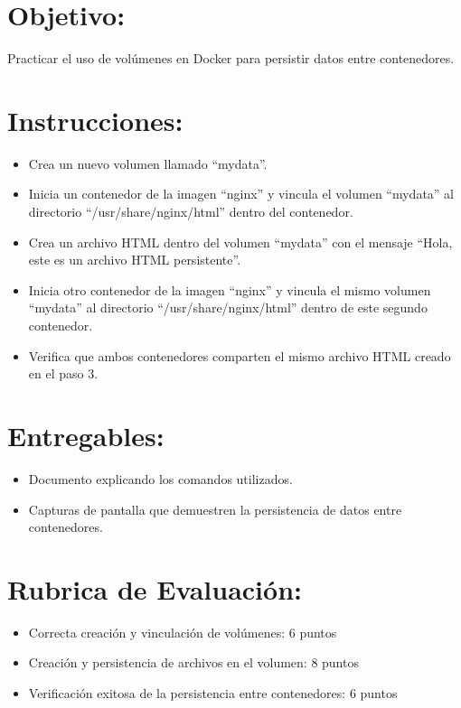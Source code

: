 \documentclass[
  a4paper,
  DIV=11,
  numbers=noendperiod,
  onepage,
  openany]{scrreprt}
\providecommand{\tightlist}{%
  \setlength{\itemsep}{0pt}\setlength{\parskip}{0pt}}\usepackage{longtable,booktabs,array}
\begin{document}
\hypertarget{objetivo-1}{%
\section{Objetivo:}\label{objetivo-1}}

Practicar el uso de volúmenes en Docker para persistir datos entre
contenedores.

\hypertarget{instrucciones}{%
\section{Instrucciones:}\label{instrucciones}}

\begin{itemize}
\tightlist
\item
  Crea un nuevo volumen llamado ``mydata''.
\item
  Inicia un contenedor de la imagen ``nginx'' y vincula el volumen
  ``mydata'' al directorio ``/usr/share/nginx/html'' dentro del
  contenedor.
\item
  Crea un archivo HTML dentro del volumen ``mydata'' con el mensaje
  ``Hola, este es un archivo HTML persistente''.
\item
  Inicia otro contenedor de la imagen ``nginx'' y vincula el mismo
  volumen ``mydata'' al directorio ``/usr/share/nginx/html'' dentro de
  este segundo contenedor.
\item
  Verifica que ambos contenedores comparten el mismo archivo HTML creado
  en el paso 3.
\end{itemize}

\hypertarget{entregables-1}{%
\section{Entregables:}\label{entregables-1}}

\begin{itemize}
\tightlist
\item
  Documento explicando los comandos utilizados.
\item
  Capturas de pantalla que demuestren la persistencia de datos entre
  contenedores.
\end{itemize}

\hypertarget{rubrica-de-evaluaciuxf3n-1}{%
\section{Rubrica de Evaluación:}\label{rubrica-de-evaluaciuxf3n-1}}

\begin{itemize}
\tightlist
\item
  Correcta creación y vinculación de volúmenes: 6 puntos
\item
  Creación y persistencia de archivos en el volumen: 8 puntos
\item
  Verificación exitosa de la persistencia entre contenedores: 6 puntos
\end{itemize}
\end{document}
